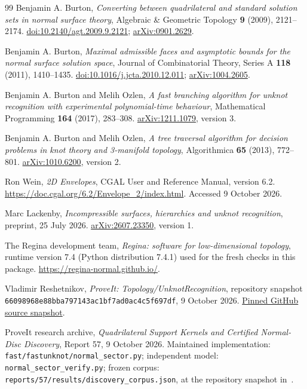 \documentclass[11pt]{article}
\theoremstyle{definition}
\theoremstyle{remark}
\begin{document}
\clearpage
\begin{thebibliography}{99}
Benjamin A. Burton, \emph{Converting between quadrilateral and standard
solution sets in normal surface theory}, Algebraic \& Geometric Topology
\textbf{9} (2009), 2121--2174.
\href{https://doi.org/10.2140/agt.2009.9.2121}{doi:10.2140/agt.2009.9.2121};
\href{https://arxiv.org/abs/0901.2629}{arXiv:0901.2629}.

Benjamin A. Burton, \emph{Maximal admissible faces and asymptotic bounds for
the normal surface solution space}, Journal of Combinatorial Theory,
Series A \textbf{118} (2011), 1410--1435.
\href{https://doi.org/10.1016/j.jcta.2010.12.011}{doi:10.1016/j.jcta.2010.12.011};
\href{https://arxiv.org/abs/1004.2605}{arXiv:1004.2605}.

Benjamin A. Burton and Melih Ozlen, \emph{A fast branching algorithm for
unknot recognition with experimental polynomial-time behaviour},
Mathematical Programming \textbf{164} (2017), 283--308.
\href{https://arxiv.org/abs/1211.1079}{arXiv:1211.1079}, version 3.

Benjamin A. Burton and Melih Ozlen, \emph{A tree traversal algorithm for
decision problems in knot theory and 3-manifold topology}, Algorithmica
\textbf{65} (2013), 772--801.
\href{https://arxiv.org/abs/1010.6200}{arXiv:1010.6200}, version 2.

Ron Wein, \emph{2D Envelopes}, CGAL User and Reference Manual, version 6.2.
\url{https://doc.cgal.org/6.2/Envelope_2/index.html}. Accessed 9 October 2026.

Marc Lackenby, \emph{Incompressible surfaces, hierarchies and unknot
recognition}, preprint, 25 July 2026.
\href{https://arxiv.org/abs/2607.23350}{arXiv:2607.23350}, version 1.

The Regina development team, \emph{Regina: software for low-dimensional
topology}, runtime version 7.4 (Python distribution 7.4.1) used for the fresh
checks in this package.
\url{https://regina-normal.github.io/}.

Vladimir Reshetnikov, \emph{ProveIt: Topology/UnknotRecognition}, repository
snapshot \texttt{66098968e88bba797143ac1bf7ad0ac4c5f697df}, 9 October 2026.
\href{https://github.com/VladimirReshetnikov/ProveIt/tree/66098968e88bba797143ac1bf7ad0ac4c5f697df/Topology/UnknotRecognition}{Pinned GitHub source snapshot}.

ProveIt research archive, \emph{Quadrilateral Support Kernels and Certified
Normal-Disc Discovery}, Report 57, 9 October 2026. Maintained implementation:
\texttt{fast/fastunknot/normal\_sector.py}; independent model:
\texttt{normal\_sector\_verify.py}; frozen corpus:
\texttt{reports/57/results/discovery\_corpus.json}, at the repository snapshot
in~\cite{repo}.


\end{thebibliography}
\end{document}
